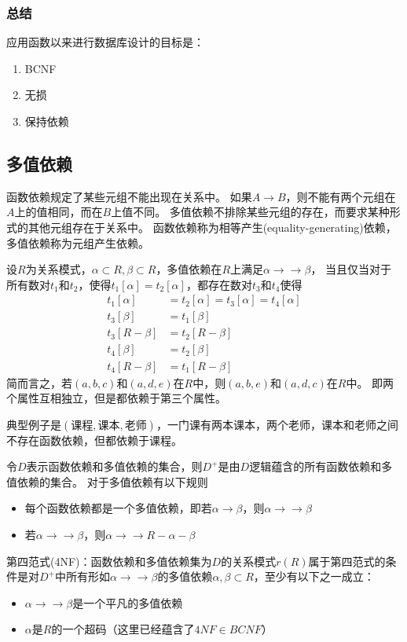 \subsubsection{总结}
应用函数以来进行数据库设计的目标是：
\begin{enumerate}
	\item BCNF
	\item 无损
	\item 保持依赖
\end{enumerate}

\subsection{多值依赖}
函数依赖规定了某些元组不能出现在关系中。
如果$A\to B$，则不能有两个元组在$A$上的值相同，而在$B$上值不同。
多值依赖不排除某些元组的存在，而要求某种形式的其他元组存在于关系中。
函数依赖称为相等产生(equality-generating)依赖，多值依赖称为元组产生依赖。
\begin{definition}
设$R$为关系模式，$\alpha\subset R,\beta\subset R$，多值依赖在$R$上满足$\alpha\to\to\beta$，%
当且仅当对于所有数对$t_1$和$t_2$，使得$t_1[\alpha]=t_2[\alpha]$，都存在数对$t_3$和$t_4$使得
\[\begin{aligned}
\displaystyle t_{1}[\alpha ]&= t_{2}[\alpha ]=t_{3}[\alpha ]=t_{4}[\alpha ]\\
\displaystyle t_{3}[\beta ]&= t_{1}[\beta ]\\
\displaystyle t_{3}[R-\beta ]&= t_{2}[R-\beta ]\\
\displaystyle t_{4}[\beta ]&= t_{2}[\beta ]\\
\displaystyle t_{4}[R-\beta ]&= t_{1}[R-\beta ]
\end{aligned}\]
简而言之，若${\displaystyle (a,b,c)}$和${\displaystyle (a,d,e)}$在$R$中，则${\displaystyle (a,b,e)}$和${\displaystyle (a,d,c)}$在$R$中。
即两个属性互相独立，但是都依赖于第三个属性。
\begin{center}
\end{center}
典型例子是$(\text{课程},\text{课本},\text{老师})$，一门课有两本课本，两个老师，课本和老师之间不存在函数依赖，但都依赖于课程。
\end{definition}

令$D$表示函数依赖和多值依赖的集合，则$D^+$是由$D$逻辑蕴含的所有函数依赖和多值依赖的集合。
对于多值依赖有以下规则
\begin{itemize}
	\item 每个函数依赖都是一个多值依赖，即若$\alpha\to\beta$，则$\alpha\to\to\beta$
	\item 若$\alpha\to\to\beta$，则$\alpha\to\to R-\alpha-\beta$
\end{itemize}

第四范式(4NF)：函数依赖和多值依赖集为$D$的关系模式$r(R)$属于第四范式的条件是对$D^+$中所有形如$\alpha\to\to\beta$的多值依赖$\alpha,\beta\subset R$，至少有以下之一成立：
\begin{itemize}
	\item $\alpha\to\to\beta$是一个平凡的多值依赖
	\item $\alpha$是$R$的一个超码（这里已经蕴含了$4NF\in BCNF$）
\end{itemize}